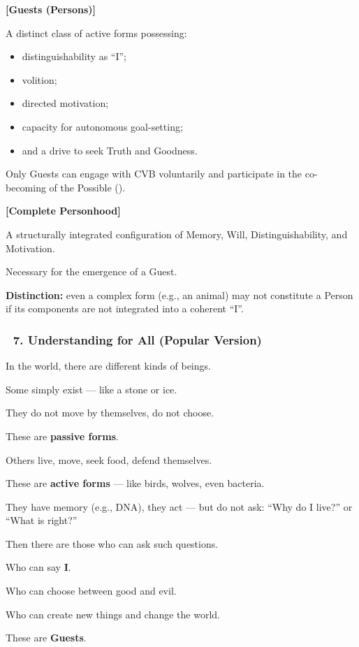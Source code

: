 \documentclass[12pt]{article}
\begin{document}
\textbf{[Guests (Persons)]}

A distinct class of active forms possessing:

\begin{itemize}
\item distinguishability as ``I'';
\item volition;
\item directed motivation;
\item capacity for autonomous goal-setting;
\item and a drive to seek Truth and Goodness.
\end{itemize}

Only Guests can engage with CVB voluntarily and participate in the co-becoming of the Possible (\text{[26]}).

\textbf{[Complete Personhood]}

A structurally integrated configuration of Memory, Will, Distinguishability, and Motivation.

Necessary for the emergence of a Guest.

\textbf{Distinction:} even a complex form (e.g., an animal) may not constitute a Person if its components are not integrated into a coherent ``I''.

\subsubsection*{🔹 7. Understanding for All (Popular Version)}

In the world, there are different kinds of beings.

Some simply exist — like a stone or ice.

They do not move by themselves, do not choose.

These are \textbf{passive forms}.

Others live, move, seek food, defend themselves.

These are \textbf{active forms} — like birds, wolves, even bacteria.

They have memory (e.g., DNA), they act — but do not ask: ``Why do I live?'' or ``What is right?''

Then there are those who can ask such questions.

Who can say \textbf{I}.

Who can choose between good and evil.

Who can create new things and change the world.

These are \textbf{Guests}.
\end{document}
